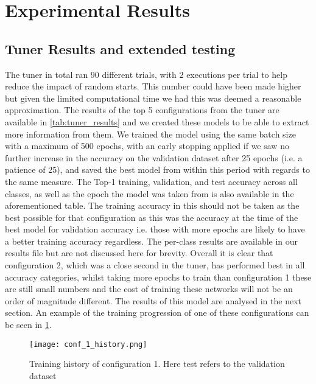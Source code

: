 \documentclass[12pt]{article}
\numberwithin{equation}{section}
\numberwithin{figure}{section}
\numberwithin{table}{section}
\begin{document}
\section{Experimental Results}
\subsection{Tuner Results and extended testing}
The tuner in total ran 90 different trials, with 2 executions per trial to help reduce the impact of random starts. This number could have been made higher but given the limited computational time we had this was deemed a reasonable approximation. The results of the top 5 configurations from the tuner are available in \cref{tab:tuner_results} and we created these models to be able to extract more information from them. We trained the model using the same batch size with a maximum of 500 epochs, with an early stopping applied if we saw no further increase in the accuracy on the validation dataset after 25 epochs (i.e. a patience of 25), and saved the best model from within this period with regards to the same measure. The Top-1 training, validation, and test accuracy across all classes, as well as the epoch the model was taken from is also available in the aforementioned table. The training accuracy in this should not be taken as the best possible for that configuration as this was the accuracy at the time of the best model for validation accuracy i.e. those with more epochs are likely to have a better training accuracy regardless. The per-class results are available in our results file but are not discussed here for brevity. Overall it is clear that configuration 2, which was a close second in the tuner, has performed best in all accuracy categories, whilst taking more epochs to train than configuration 1 these are still small numbers and the cost of training these networks will not be an order of magnitude different. The results of this model are analysed in the next section. An example of the training progression of one of these configurations can be seen in \cref{fig:training_hist}.

\begin{figure}
	\centering
	\captionsetup{justification=centering}
  \texttt{[image: conf\_1\_history.png]}
	\caption{Training history of configuration 1. Here test refers to the validation dataset}
	\label{fig:training_hist}
\end{figure}
\end{document}

